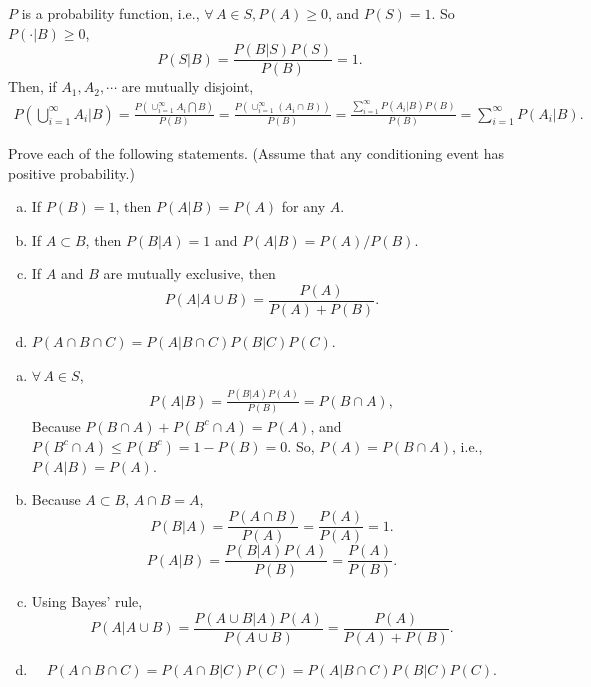 \documentclass[12pt]{elegantbook}
\begin{document}
    \begin{solution}
        $P$ is a probability function, i.e., $\forall\,A\in S, P(A)\geq 0$, and $P(S)=1$. So $P(\cdot|B)\geq0$,
        \[
            P(S|B)=\frac{P(B|S)P(S)}{P(B)}=1. 
        \]
        Then, if $A_1, A_2, \cdots$ are mutually disjoint, 
        \begin{align*}
            P\left(\bigcup_{i=1}^\infty A_i\big|B\right)=\frac{P\left(\cup_{i=1}^\infty A_i \bigcap B\right)}{P(B)}=\frac{P(\cup_{i=1}^\infty(A_i\cap B))}{P(B)}=\frac{\sum_{i=1}^\infty P(A_i|B)P(B)}{P(B)}=\sum_{i=1}^\infty P(A_i|B). 
        \end{align*}
    \end{solution}

    \setcounter{exer}{37}
    \begin{exercise}
        Prove each of the following statements. (Assume that any conditioning event has positive probability.)
        \begin{enumerate}[(a)]
            \item If $P(B)=1$, then $P(A|B)=P(A)$ for any $A$. 
            \item If $A\subset B$, then $P(B|A)=1$ and $P(A|B)=P(A)/P(B)$. 
            \item If $A$ and $B$ are mutually exclusive, then \[
                P(A|A\cup B)=\frac{P(A)}{P(A)+P(B)}. 
            \]
            \item $P(A\cap B\cap C)=P(A|B\cap C)P(B|C)P(C)$. 
        \end{enumerate}
    \end{exercise}

    \begin{solution}
        \begin{enumerate}[(a)]
            \item $\forall\,A\in S$, \begin{align*}
                P(A|B)=\frac{P(B|A)P(A)}{P(B)}=P(B\cap A), 
            \end{align*}
            Because $P(B\cap A)+P(B^c\cap A)=P(A)$, and $P(B^c\cap A)\leq P(B^c)=1-P(B)=0$. So, $P(A)=P(B\cap A)$, i.e., $P(A|B)=P(A)$. 
            \item Because $A\subset B$, $A\cap B=A$, 
            \[
                P(B|A)=\frac{P(A\cap B)}{P(A)}=\frac{P(A)}{P(A)}=1. 
            \]
            \[
                P(A|B)=\frac{P(B|A)P(A)}{P(B)}=\frac{P(A)}{P(B)}. 
            \]
            \item Using Bayes' rule,
            \[
                P(A|A\cup B)=\frac{P(A\cup B|A)P(A)}{P(A\cup B)}=\frac{P(A)}{P(A)+P(B)}. 
            \]
            \item \[
                P(A\cap B\cap C)=P(A\cap B|C)P(C)=P(A|B\cap C)P(B|C)P(C). 
            \]
        \end{enumerate}
    \end{solution}
\end{document}
